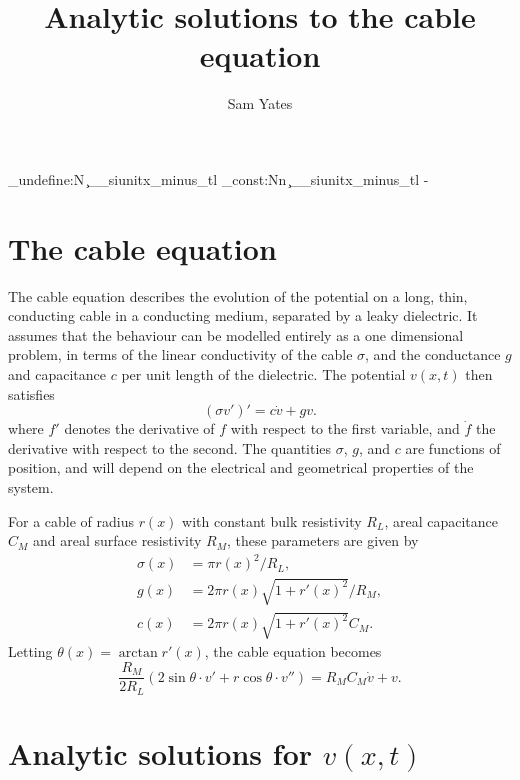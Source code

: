 \documentclass[parskip=half]{scrartcl}
\title{Analytic solutions to the cable equation}
\author{Sam Yates}
\theoremstyle{nonumberplain}
\begin{document}
\ExplSyntaxOn
    \cs_undefine:N \c__siunitx_minus_tl
    \tl_const:Nn \c__siunitx_minus_tl { - }
\ExplSyntaxOff

\maketitle

\section{The cable equation}

The cable equation describes the evolution of the potential
on a long, thin, conducting cable in a conducting medium, separated
by a leaky dielectric. It assumes that the behaviour
can be modelled entirely as a one dimensional problem,
in terms of the linear conductivity of the cable $\sigma$,
and the conductance $g$ and capacitance $c$ per unit length of the
dielectric. The potential $v(x, t)$ then satisfies
\begin{equation}
    (\sigma v')' = c \dot v + g v.
\end{equation}
where $f'$ denotes the derivative of $f$ with respect to the first
variable, and $\dot{f}$ the derivative with respect to the second.
The quantities $\sigma$, $g$, and $c$ are functions of position,
and will depend on the electrical and geometrical properties of
the system.

For a cable of radius $r(x)$ with constant bulk resistivity
$R_L$, areal capacitance $C_M$ and areal surface resistivity
$R_M$, these parameters are given by
\begin{align}
    \sigma(x) &= \pi r(x)^2 / R_L, \\
    g(x) &= 2 \pi r(x) \sqrt{1 + r'(x)^2} / R_M, \\
    c(x) &= 2 \pi r(x) \sqrt{1 + r'(x)^2} C_M.
\end{align}
Letting $\theta(x) = \arctan r'(x)$, the cable equation becomes
\begin{equation}
    \label{eq:constelec}
    \frac{R_M}{2 R_L}\left(
        2\sin\theta\cdot v' + r \cos\theta\cdot v''
    \right) =
    R_M C_M \dot v + v.
\end{equation}

\section{Analytic solutions for $v(x, t)$}
\end{document}
